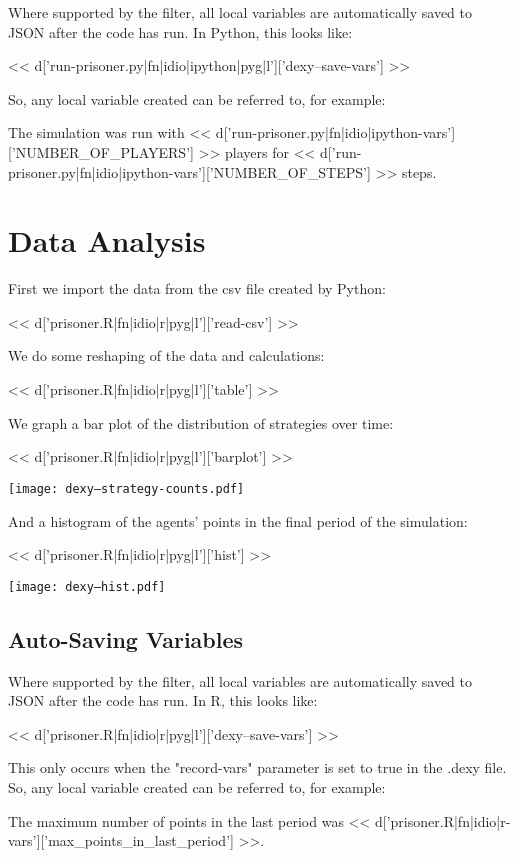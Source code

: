 \documentclass[a4paper]{tufte-handout}
\begin{document}
Where supported by the filter, all local variables are automatically saved to
JSON after the code has run. In Python, this looks like:

<< d['run-prisoner.py|fn|idio|ipython|pyg|l']['dexy--save-vars'] >>

So, any local variable created can be referred to, for example:

\sffamily

The simulation was run with
<< d['run-prisoner.py|fn|idio|ipython-vars']['NUMBER_OF_PLAYERS'] >> players for
<< d['run-prisoner.py|fn|idio|ipython-vars']['NUMBER_OF_STEPS'] >> steps.

\normalfont

\section{Data Analysis}

First we import the data from the csv file created by Python:

<< d['prisoner.R|fn|idio|r|pyg|l']['read-csv'] >>

We do some reshaping of the data and calculations:

<< d['prisoner.R|fn|idio|r|pyg|l']['table'] >>

We graph a bar plot of the distribution of strategies over time:

<< d['prisoner.R|fn|idio|r|pyg|l']['barplot'] >>

\texttt{[image: dexy--strategy-counts.pdf]}

And a histogram of the agents' points in the final period of the simulation:

<< d['prisoner.R|fn|idio|r|pyg|l']['hist'] >>

\texttt{[image: dexy--hist.pdf]}

\subsection{Auto-Saving Variables}

Where supported by the filter, all local variables are automatically saved to
JSON after the code has run. In R, this looks like:

<< d['prisoner.R|fn|idio|r|pyg|l']['dexy--save-vars'] >>

This only occurs when the "record-vars" parameter is set to true in the .dexy
file. So, any local variable created can be referred to, for example:

\sffamily
The maximum number of points in the last period was
<< d['prisoner.R|fn|idio|r-vars']['max_points_in_last_period'] >>.
\normalfont
\end{document}
